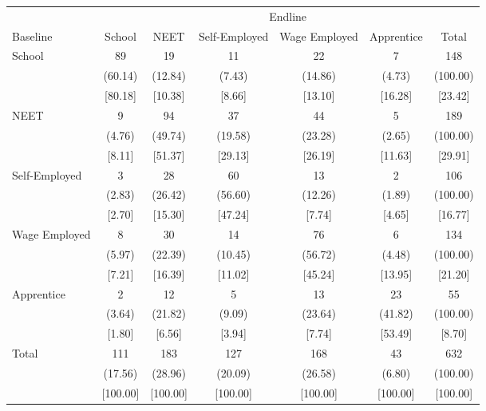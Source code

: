 {
\def\sym#1{\ifmmode^{#1}\else\(^{#1}\)\fi}
\begin{tabular}{l*{6}{c}}
\hline\hline
            &\multicolumn{6}{c}{Endline}                                                  \\
Baseline    &      School&        NEET&Self-Employed&Wage Employed&  Apprentice&       Total\\
\hline
School      &          89&          19&          11&          22&           7&         148\\
            &     (60.14)&     (12.84)&      (7.43)&     (14.86)&      (4.73)&    (100.00)\\
            &     [80.18]&     [10.38]&      [8.66]&     [13.10]&     [16.28]&     [23.42]\\
NEET        &           9&          94&          37&          44&           5&         189\\
            &      (4.76)&     (49.74)&     (19.58)&     (23.28)&      (2.65)&    (100.00)\\
            &      [8.11]&     [51.37]&     [29.13]&     [26.19]&     [11.63]&     [29.91]\\
Self-Employed&           3&          28&          60&          13&           2&         106\\
            &      (2.83)&     (26.42)&     (56.60)&     (12.26)&      (1.89)&    (100.00)\\
            &      [2.70]&     [15.30]&     [47.24]&      [7.74]&      [4.65]&     [16.77]\\
Wage Employed&           8&          30&          14&          76&           6&         134\\
            &      (5.97)&     (22.39)&     (10.45)&     (56.72)&      (4.48)&    (100.00)\\
            &      [7.21]&     [16.39]&     [11.02]&     [45.24]&     [13.95]&     [21.20]\\
Apprentice  &           2&          12&           5&          13&          23&          55\\
            &      (3.64)&     (21.82)&      (9.09)&     (23.64)&     (41.82)&    (100.00)\\
            &      [1.80]&      [6.56]&      [3.94]&      [7.74]&     [53.49]&      [8.70]\\
Total       &         111&         183&         127&         168&          43&         632\\
            &     (17.56)&     (28.96)&     (20.09)&     (26.58)&      (6.80)&    (100.00)\\
            &    [100.00]&    [100.00]&    [100.00]&    [100.00]&    [100.00]&    [100.00]\\
\hline\hline
\end{tabular}
}
